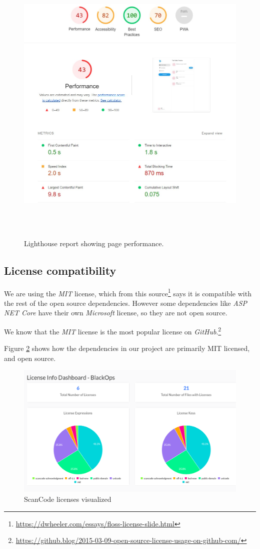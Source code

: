 \begin{figure}[H]
    \centering
    \includegraphics[width=16cm,height=14cm,keepaspectratio]{images/lighthouse.jpg}
    \caption{Lighthouse report showing page performance.}
    \label{ComponentDiagram_1}
\end{figure}


\subsection{License compatibility}
We are using the \textit{MIT} license, which from this source\footnote{\url{https://dwheeler.com/essays/floss-license-slide.html}} says it is compatible with the rest of the open source dependencies. However some dependencies like \textit{ASP NET Core} have their own \textit{Microsoft} license, so they are not open source.

We know that the \textit{MIT} license is the most popular license on \textit{GitHub}.\footnote{\url{https://github.blog/2015-03-09-open-source-license-usage-on-github-com/}}

Figure \ref{fig:scancodelicenses} shows how the dependencies in our project are primarily MIT licensed, and open source.

\begin{figure}[H]
    \centering
    \includegraphics[width=16cm, keepaspectratio]{images/Scancode-licenses2.png}
    \caption{ScanCode licenses visualized}
    \label{fig:scancodelicenses}
\end{figure}
